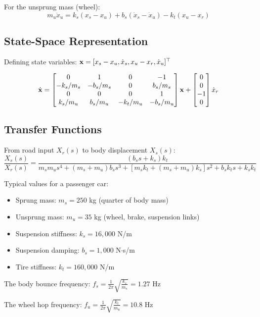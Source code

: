 For the unsprung mass (wheel):
\begin{equation}
m_u\ddot{x}_u = k_s(x_s - x_u) + b_s(\dot{x}_s - \dot{x}_u) - k_t(x_u - x_r)
\end{equation}

\subsection{State-Space Representation}

Defining state variables: $\mathbf{x} = [x_s - x_u, \dot{x}_s, x_u - x_r, \dot{x}_u]^\top$

\begin{equation}
\dot{\mathbf{x}} = \begin{bmatrix}
0 & 1 & 0 & -1 \\
-k_s/m_s & -b_s/m_s & 0 & b_s/m_s \\
0 & 0 & 0 & 1 \\
k_s/m_u & b_s/m_u & -k_t/m_u & -b_s/m_u
\end{bmatrix} \mathbf{x} + \begin{bmatrix} 0 \\ 0 \\ -1 \\ 0 \end{bmatrix} \dot{x}_r
\end{equation}

\subsection{Transfer Functions}

From road input $X_r(s)$ to body displacement $X_s(s)$:
\begin{equation}
\frac{X_s(s)}{X_r(s)} = \frac{(b_s s + k_s)k_t}{m_s m_u s^4 + (m_s + m_u)b_s s^3 + [m_s k_t + (m_s + m_u)k_s]s^2 + b_s k_t s + k_s k_t}
\end{equation}

\begin{examplebox}[title=Example 1.3: Quarter-Car Parameters]
Typical values for a passenger car:
\begin{itemize}
    \item Sprung mass: $m_s = 250$ kg (quarter of body mass)
    \item Unsprung mass: $m_u = 35$ kg (wheel, brake, suspension links)
    \item Suspension stiffness: $k_s = 16{,}000$ N/m
    \item Suspension damping: $b_s = 1{,}000$ N$\cdot$s/m
    \item Tire stiffness: $k_t = 160{,}000$ N/m
\end{itemize}

The body bounce frequency: $f_s = \frac{1}{2\pi}\sqrt{\frac{k_s}{m_s}} = 1.27$ Hz

The wheel hop frequency: $f_u = \frac{1}{2\pi}\sqrt{\frac{k_t}{m_u}} = 10.8$ Hz
\end{examplebox}

